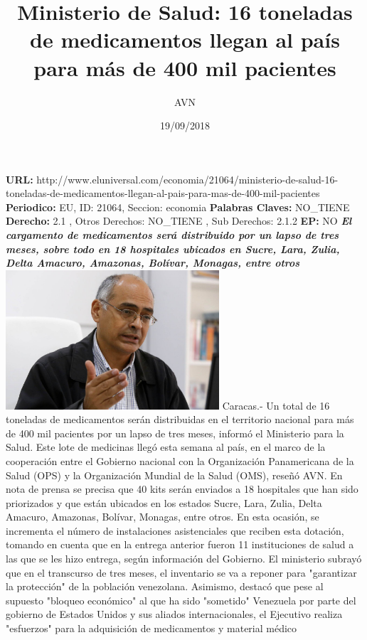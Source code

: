 \documentclass{article}%
\title{\textbf{Ministerio de Salud: 16 toneladas de medicamentos llegan al país para más de 400 mil pacientes}}%
\author{AVN}%
\date{19/09/2018}%
\begin{document}
%
\normalsize%
\maketitle%
\textbf{URL: }%
http://www.eluniversal.com/economia/21064/ministerio{-}de{-}salud{-}16{-}toneladas{-}de{-}medicamentos{-}llegan{-}al{-}pais{-}para{-}mas{-}de{-}400{-}mil{-}pacientes\newline%
%
\textbf{Periodico: }%
EU, %
ID: %
21064, %
Seccion: %
economia\newline%
%
\textbf{Palabras Claves: }%
NO\_TIENE\newline%
%
\textbf{Derecho: }%
2.1%
, Otros Derechos: %
NO\_TIENE%
, Sub Derechos: %
2.1.2%
\newline%
%
\textbf{EP: }%
NO\newline%
\newline%
%
\textbf{\textit{El cargamento de medicamentos será distribuido por un lapso de tres meses, sobre todo en 18 hospitales ubicados en Sucre, Lara, Zulia, Delta Amacuro, Amazonas, Bolívar, Monagas, entre otros}}%
\newline%
\newline%
%
\includegraphics[width=300px]{51.jpg}%
\newline%
%
Caracas.{-} Un total de 16 toneladas de medicamentos serán distribuidas en el territorio nacional para más de 400 mil pacientes por un lapso de tres meses, informó el Ministerio para la Salud.%
\newline%
%
Este lote de medicinas llegó esta semana al país, en el marco de la cooperación entre el Gobierno nacional con la Organización Panamericana de la Salud (OPS) y la Organización Mundial de la Salud (OMS), reseñó AVN.%
\newline%
%
En nota de prensa se precisa que 40 kits serán enviados a 18 hospitales que han sido priorizados y que están ubicados en los estados Sucre, Lara, Zulia, Delta Amacuro, Amazonas, Bolívar, Monagas, entre otros.%
\newline%
%
En esta ocasión, se incrementa el número de instalaciones asistenciales que reciben esta dotación, tomando en cuenta que en la entrega anterior fueron 11 instituciones de salud a las que se les hizo entrega, según información del Gobierno.%
\newline%
%
El ministerio subrayó que en el transcurso de tres meses, el inventario se va a reponer para "garantizar la protección" de la población venezolana.%
\newline%
%
Asimismo, destacó que pese al supuesto "bloqueo económico" al que ha sido "sometido" Venezuela por parte del gobierno de Estados Unidos y sus aliados internacionales, el Ejecutivo realiza "esfuerzos" para la adquisición de medicamentos y material médico%
\newline%
%
\end{document}
